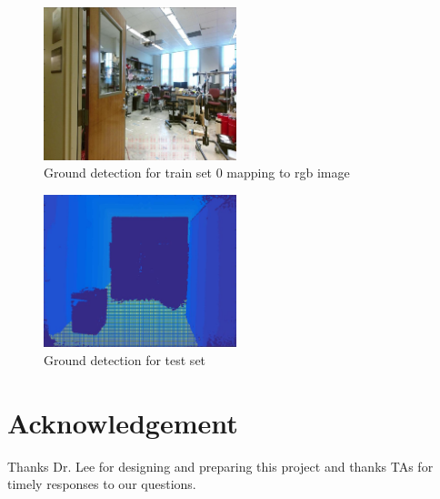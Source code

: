 \documentclass[letterpaper,twocolumn,10pt]{article}
\begin{document}
\begin{figure}[h]
    \centering
    \includegraphics[width=0.5\textwidth]{results/train0_ground_rgb.jpg}
    \caption{Ground detection for train set 0 mapping to rgb image}
    \label{fig:ground0rgb}
\end{figure}

\begin{figure}[h]
    \centering
    \includegraphics[width=0.5\textwidth]{results/test_ground_d.jpg}
    \caption{Ground detection for test set}
    \label{fig:ground0}
\end{figure}



\section*{Acknowledgement}
Thanks Dr. Lee for designing and preparing this project and thanks TAs for timely responses to our questions.

{\footnotesize 
}


\end{document}
